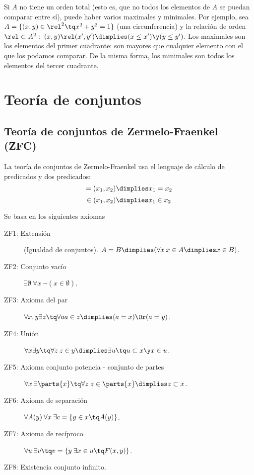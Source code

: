 \documentclass[nochap]{apuntes}
\begin{document}
\begin{remark} Si $A$ no tiene un orden total (esto es, que no todos los elementos de $A$ se puedan comparar entre sí), puede haber varios maximales y minimales. Por ejemplo, sea $A=\{ (x,y) \in \rel^2 \tq x^2+y^2=1\}$ (una circunferencia) y la relación de orden $\rel \subset A^2 : \; (x,y)\rel(x',y') \dimplies (x\leq x') \y (y \leq y')$. Los maximales son los elementos del primer cuadrante: son mayores que cualquier elemento con el que los podamos comparar. De la misma forma, los minimales son todos los elementos del tercer cuadrante.\end{remark}



\section{Teoría de conjuntos}

\subsection{Teoría de conjuntos de Zermelo-Fraenkel (ZFC)}
La teoría de conjuntos de Zermelo-Fraenkel usa el lenguaje de cálculo de predicados y dos predicados: \[=(x_1,x_2) \dimplies x_1=x_2\] \[\in (x_1,x_2) \dimplies x_1 \in x_2 \]

Se basa en los siguientes axiomas

\begin{description}
\item[ZF1: Extensión] (Igualdad de conjuntos). $A=B \dimplies (\forall x\: x\in A \dimplies x \in B)$.
\item[ZF2: Conjunto vacío] $\exists \emptyset \: \forall x \: \neg(x\in \emptyset)$.
\item[ZF3: Axioma del par] $\forall x,y \exists z \tq \forall a a \in z \dimplies (a=x) \Or (a=y)$.
\item[ZF4: Unión] $\forall x \exists y \tq \forall z \: z\in y \dimplies \exists u \tq u\subset x \y x\in u$.
\item[ZF5: Axioma conjunto potencia - conjunto de partes] $ \forall x \:\exists \parts{x} \tq \forall  z \; z\in \parts{x} \dimplies z\subset x$.
\item[ZF6: Axioma de separación] $\forall A(y) \:\forall x \: \exists c=\{y\in x \tq A(y)\}$.
\item[ZF7: Axioma de recíproco] $\forall u \: \exists v \tq v=\{y \: \exists x\in u \tq F(x,y)\}$.
\item[ZF8: Existencia conjunto infinito.]
\end{description}
\end{document}
